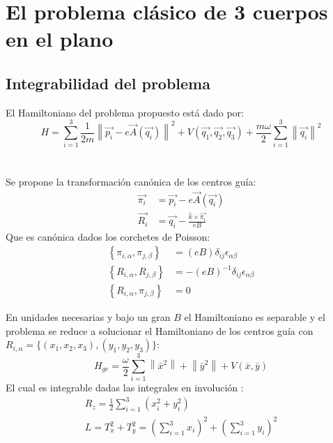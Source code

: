 \documentclass[xcolor=dvipsnames]{beamer}
\newcommand{\norm}[1]{\left\lVert #1 \right\rVert}
\newcommand{\roundP}[1]{\left( #1 \right)}
\newcommand{\poisson}[2]{\left\lbrace #1, #2 \right\rbrace}
\begin{document}
\section{El problema clásico de 3 cuerpos en el plano}
\subsection{Integrabilidad del problema}
\begin{frame}
El Hamiltoniano del problema propuesto está dado por:
\begin{equation*}
H = \sum_{i=1}^{3} \frac{1}{2m} \norm{ \vec{p_i} - 
e\vec{ A } \left( \vec{q_i} \right)}^2
+ V \roundP{ \vec{q_1},\vec{q_2},\vec{q_3} }
+\frac{m\omega}{2}\sum_{i=1}^{3} \norm{\vec{q_i}}^2
\end{equation*}
\\~\\
Se propone la transformación canónica de los centros guía:
\begin{align*}
\vec{\pi_i} &= \vec{p_i} - e\vec{A}\roundP{\vec{q_i}}\\
\vec{R_i} &= \vec{q_i} - \frac{\hat{k}\times\vec{\pi_i}}{eB}
\end{align*}
Que es canónica dados los corchetes de Poisson:
\begin{align*}
\poisson{\pi_{i,\alpha}}{\pi_{j,\beta}}&=\roundP{eB}\delta_{ij}\epsilon_{\alpha \beta}\\  
\poisson{R_{i,\alpha}}{R_{j,\beta}}&= -\roundP{eB}^{-1} \delta_{ij}\epsilon_{\alpha \beta}\\  
\poisson{R_{i,\alpha}}{\pi_{j,\beta}}&=0
\end{align*}
\end{frame}
\begin{frame}
En unidades necesarias y bajo un gran $B$ el Hamiltoniano es separable y el problema se reduce a solucionar el Hamiltoniano de los centros guía con $R_{i,\alpha} = \{(x_1,x_2,x_3),(y_1,y_2,y_3)\}$:
\begin{equation*}
H_{gc} = \frac{{\omega}}{2} \sum_{i=1}^{3} \norm{\bar{x}^2} + \norm{\bar{y}^2}
+ V\roundP{\bar{x},\bar{y}}
\end{equation*}
El cual es integrable dadas las integrales en involución \cite{scheck}:
\begin{align*}
R_z = \frac{1}{2} \sum_{i=1}^{3} \roundP{x_i^2 + y_i^2}\\
L = T_x^2 + T_y^2 = \roundP{\sum_{i=1}^{3} x_i}^2 + \roundP{\sum_{i=1}^{3} y_i}^2\\
\end{align*}
\end{frame}
\end{document}
